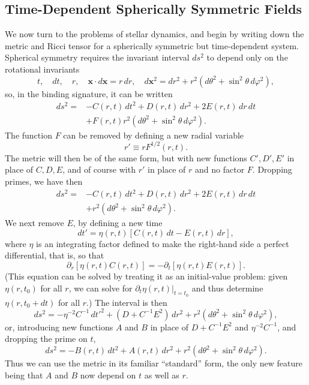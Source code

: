 
\subsection{Time-Dependent Spherically Symmetric Fields}\label{sec:11.7}

We now turn to the problems of stellar dynamics, and begin by writing down the
metric and Ricci tensor for a spherically symmetric but time-dependent system.
Spherical symmetry requires the invariant interval \(ds^2\) to depend only on
the rotational invariants
\[
  t,\quad dt,\quad r,\quad
  \mathbf{x}\cdot d\mathbf{x}=r\,dr,\quad
  d\mathbf{x}^2=dr^2+r^2(d\theta^2+\sin^2\theta\,d\varphi^2),
\]
so, in the binding signature, it can be written
\[
  \begin{aligned}
  ds^2={}&
  -C(r,t)\,dt^2+D(r,t)\,dr^2+2E(r,t)\,dr\,dt\\
  &+F(r,t)r^2(d\theta^2+\sin^2\theta\,d\varphi^2).
  \end{aligned}
\]
The function \(F\) can be removed by defining a new radial variable
\[
  r'\equiv rF^{1/2}(r,t).
\]
The metric will then be of the same form, but with new functions
\(C',D',E'\) in place of \(C,D,E\), and of course with \(r'\) in place of
\(r\) and no factor \(F\). Dropping primes, we have then
\[
  \begin{aligned}
  ds^2={}&
  -C(r,t)\,dt^2+D(r,t)\,dr^2+2E(r,t)\,dr\,dt\\
  &+r^2(d\theta^2+\sin^2\theta\,d\varphi^2).
  \end{aligned}
\]
We next remove \(E\), by defining a new time
\[
  dt'=\eta(r,t)[C(r,t)\,dt-E(r,t)\,dr],
\]
where \(\eta\) is an integrating factor defined to make the right-hand side a
perfect differential, that is, so that
\[
  \partial_r[\eta(r,t)C(r,t)]
  =
  -\partial_t[\eta(r,t)E(r,t)].
\]
(This equation can be solved by treating it as an initial-value problem:
given \(\eta(r,t_0)\) for all \(r\), we can solve for
\(\partial_t\eta(r,t)|_{t=t_0}\) and thus determine
\(\eta(r,t_0+dt)\) for all \(r\).) The interval is then
\[
  ds^2
  =
  -\eta^{-2}C^{-1}\,dt'^2
  +(D+C^{-1}E^2)\,dr^2
  +r^2(d\theta^2+\sin^2\theta\,d\varphi^2),
\]
or, introducing new functions \(A\) and \(B\) in place of
\(D+C^{-1}E^2\) and \(\eta^{-2}C^{-1}\), and dropping the prime on \(t\),
\begin{equation}
  ds^2
  =
  -B(r,t)\,dt^2+A(r,t)\,dr^2
  +r^2(d\theta^2+\sin^2\theta\,d\varphi^2).
  \tag{11.7.1}\label{eq:11.7.1}
\end{equation}
Thus we can use the metric in its familiar ``standard'' form, the only new
feature being that \(A\) and \(B\) now depend on \(t\) as well as \(r\).

